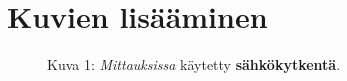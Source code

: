 \section{Kuvien lisääminen}

\begin{figure}[!htb]
	\def\svgwidth{\columnwidth}
	
	\caption{Kuva 1: \textit{Mittauksissa} käytetty \textbf{sähkökytkentä}. \cite{1234}}
\end{figure}